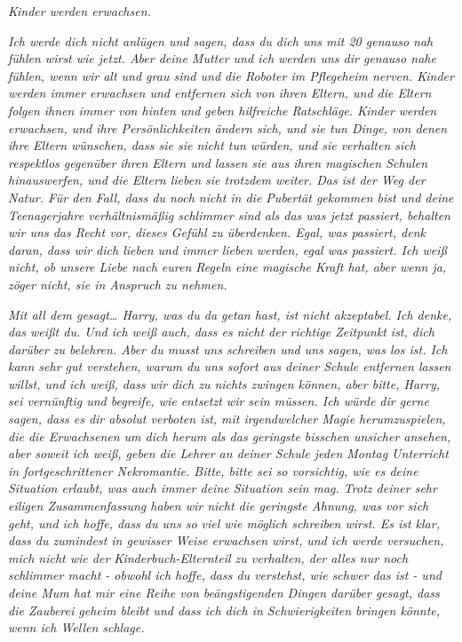 {\emph{Kinder werden erwachsen.}

\emph{Ich werde dich nicht anlügen und sagen, dass du dich uns mit 20 genauso nah fühlen wirst wie jetzt. Aber deine Mutter und ich werden uns dir genauso nahe fühlen, wenn wir alt und grau sind und die Roboter im Pflegeheim nerven. Kinder werden immer erwachsen und entfernen sich von ihren Eltern, und die Eltern folgen ihnen immer von hinten und geben hilfreiche Ratschläge. Kinder werden erwachsen, und ihre Persönlichkeiten ändern sich, und sie tun Dinge, von denen ihre Eltern wünschen, dass sie sie nicht tun würden, und sie verhalten sich respektlos gegenüber ihren Eltern und lassen sie aus ihren magischen Schulen hinauswerfen, und die Eltern lieben sie trotzdem weiter. Das ist der Weg der Natur. Für den Fall, dass du noch nicht in die Pubertät gekommen bist und deine Teenagerjahre verhältnismäßig schlimmer sind als das was jetzt passiert, behalten wir uns das Recht vor, dieses Gefühl zu überdenken. Egal, was passiert, denk daran, dass wir dich lieben und immer lieben werden, egal was passiert. Ich weiß nicht, ob unsere Liebe nach euren Regeln eine magische Kraft hat, aber wenn ja, zöger nicht, sie in Anspruch zu nehmen.}

\emph{Mit all dem gesagt… Harry, was du da getan hast, ist nicht akzeptabel. Ich denke, das weißt du. Und ich weiß auch, dass es nicht der richtige Zeitpunkt ist, dich darüber zu belehren. Aber du musst uns schreiben und uns sagen, was los ist. Ich kann sehr gut verstehen, warum du uns sofort aus deiner Schule entfernen lassen willst, und ich weiß, dass wir dich zu nichts zwingen können, aber bitte, Harry, sei vernünftig und begreife, wie entsetzt wir sein müssen. Ich würde dir gerne sagen, dass es dir absolut verboten ist, mit irgendwelcher Magie herumzuspielen, die die Erwachsenen um dich herum als das geringste bisschen unsicher ansehen, aber soweit ich weiß, geben die Lehrer an deiner Schule jeden Montag Unterricht in fortgeschrittener Nekromantie. Bitte, bitte sei so vorsichtig, wie es deine Situation erlaubt, was auch immer deine Situation sein mag. Trotz deiner sehr eiligen Zusammenfassung haben wir nicht die geringste Ahnung, was vor sich geht, und ich hoffe, dass du uns so viel wie möglich schreiben wirst. Es ist klar, dass du zumindest in gewisser Weise erwachsen wirst, und ich werde versuchen, mich nicht wie der Kinderbuch-Elternteil zu verhalten, der alles nur noch schlimmer macht - obwohl ich hoffe, dass du verstehst, wie schwer das ist - und deine Mum hat mir eine Reihe von beängstigenden Dingen darüber gesagt, dass die Zauberei geheim bleibt und dass ich dich in Schwierigkeiten bringen könnte, wenn ich Wellen schlage.}

}

